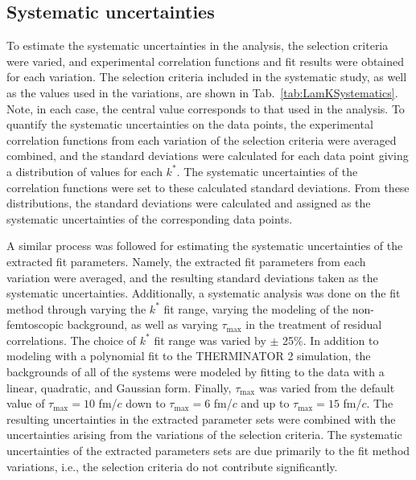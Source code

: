 \documentclass[ALICE,manyauthors]{cernphprep}
\newcommand{\kstar}{$k^{*}$\xspace}
\begin{document}
\subsection{Systematic uncertainties}
\label{SysErrs}

To estimate the systematic uncertainties in the analysis, the selection criteria were varied, and {\color{blue}experimental} correlation functions and fit results were obtained for each variation.
{\color{red}The selection criteria included in the systematic study, as well as the values used in the variations, are shown in Tab.~\ref{tab:LamKSystematics}.  
Note, in each case, the central value corresponds to that used in the analysis.}
To quantify the systematic uncertainties on the data {\color{blue}points}, the {\color{blue}experimental} correlation functions from each variation of the selection criteria were {\color{red}averaged} {\color{blue}combined}, {\color{red}and the standard deviations were calculated for each data point} {\color{blue}giving a distribution of values for each \kstar}.
{\color{red}The systematic uncertainties of the correlation functions were set to these calculated standard deviations.}
{\color{blue}From these distributions, the standard deviations were calculated and assigned as the systematic uncertainties of the corresponding data points.}

A similar process was followed for estimating the systematic uncertainties of the extracted fit parameters.
Namely, the extracted fit parameters from each variation were averaged, and the resulting standard deviations taken as the systematic uncertainties.
Additionally, a systematic analysis was done on the fit method through varying the \kstar fit range, varying the modeling of the non-femtoscopic background, as well as varying $\tau_{\mathrm{max}}$ in the treatment of residual correlations.
The choice of \kstar fit range was varied by $\pm$ 25\%.
In addition to modeling with a polynomial fit to the THERMINATOR 2 simulation, the backgrounds of all of the systems were modeled by fitting to the data with a linear, quadratic, and Gaussian form.
Finally, $\tau_{\mathrm{max}}$ was varied from the default value of $\tau_{\mathrm{max}} = 10$ fm/$c$ down to $\tau_{\mathrm{max}} = 6$ fm/$c$ and up to $\tau_{\mathrm{max}} = 15$ fm/$c$.
The resulting uncertainties in the extracted parameter sets were combined with the uncertainties arising from the variations of the selection criteria.
{\color{blue}The systematic uncertainties of the extracted parameters sets are due primarily to the fit method variations, i.e., the selection criteria do not contribute significantly.}
\end{document}
